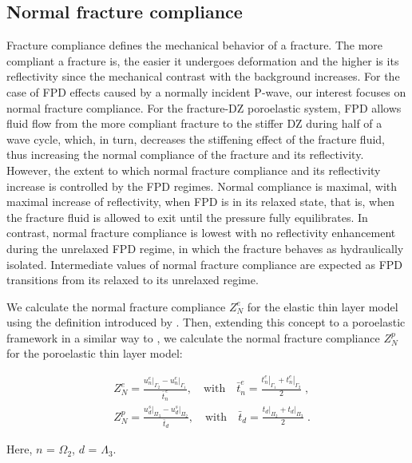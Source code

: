 \documentclass[draft]{agujournal2019}
\begin{document}
\subsection{Normal fracture compliance}
Fracture compliance defines the mechanical behavior of a fracture. The more compliant a fracture is, the easier it undergoes deformation and the higher is its reflectivity since the mechanical contrast with the background increases. For the case of FPD effects caused by a normally incident P-wave, our interest focuses on normal fracture compliance. For the fracture-DZ poroelastic system, FPD  allows fluid flow from the more compliant fracture to the stiffer DZ during half of a wave cycle, which, in turn, decreases the stiffening effect of the fracture fluid, thus 
increasing the normal compliance of the fracture and its reflectivity.
However, the extent to which normal fracture compliance and its reflectivity increase
is controlled by the FPD regimes. Normal compliance is maximal,  with maximal increase of reflectivity, when FPD is in its relaxed state, that is, when the fracture fluid is allowed to exit until the pressure fully equilibrates. In contrast,  normal fracture compliance is lowest with no reflectivity enhancement during the unrelaxed FPD regime, in which the fracture behaves as hydraulically isolated. Intermediate values of normal fracture compliance are expected as FPD transitions from its relaxed to its unrelaxed regime.

We calculate the normal fracture compliance  $Z_N^e$ for the elastic thin layer model using the definition introduced by . Then, extending this concept to a poroelastic framework in a similar way to , we calculate the normal fracture compliance $Z_N^p$ for the poroelastic thin layer model:
\begin{linenomath*}
\begin{equation}\label{Eq.22}
\begin{split}
& Z_N^e =  \frac{ \left.u_{n}^e \right \rvert_{\Gamma_2} - \left.u_{n}^e \right \rvert_{\Gamma_1}}{\bar t^{\,e}_n},  \quad \text{with} \quad
\bar t^{e}_{n} = \frac{ \left.t^{e}_{n} \right \rvert_{\Gamma_1}+ \left.t^{e}_n \right \rvert_{\Gamma_2}}{2}\; , \\
& Z_N^p =  \frac{ \left.u_{d }^s \right \rvert_{\Pi_3} - \left.u_{d}^s \right \rvert_{\Pi_2}}{\bar t_d},  \quad \text{with} \quad
\bar t_{d} = \frac{ \left.t_{d} \right \rvert_{\Pi_2}+ \left.t_{d} \right \rvert_{\Pi_3}}{2} \;.
\end{split}
\end{equation} 
\end{linenomath*}
Here, $n$ = $\Omega_2$, $d$ = $\Lambda_3$.
\end{document}
